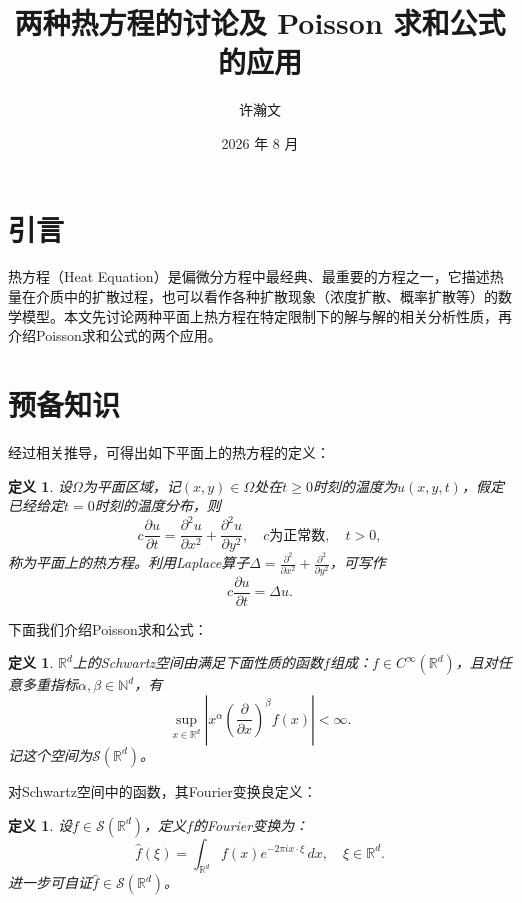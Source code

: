 \documentclass[UTF8,zihao=5,linespread=1.34]{ctexart}
\title{两种热方程的讨论及 Poisson 求和公式的应用}
\author{许瀚文}
\date{2026 年 8 月}
\theoremstyle{cnplain}
\newtheorem{definition}[theorem]{定义}
\theoremstyle{cnremark}
\begin{document}
\maketitle

\section*{引言}

热方程（Heat Equation）是偏微分方程中最经典、最重要的方程之一，它描述热量在介质中的扩散过程，也可以看作各种扩散现象（浓度扩散、概率扩散等）的数学模型。本文先讨论两种平面上热方程在特定限制下的解与解的相关分析性质，再介绍Poisson求和公式的两个应用。

\setcounter{section}{-1}
\section{预备知识}

经过相关推导，可得出如下平面上的热方程的定义：

\begin{definition}
设$\Omega$为平面区域，记$(x,y) \in \Omega$处在$t \geq 0$时刻的温度为$u(x,y,t)$，假定已经给定$t = 0$时刻的温度分布，则
\[
c\frac{\partial u}{\partial t} = \frac{\partial^{2}u}{\partial x^{2}} + \frac{\partial^{2}u}{\partial y^{2}},\quad c\text{为正常数},\quad t>0,
\]
称为平面上的热方程。利用Laplace算子$\Delta = \frac{\partial^{2}}{\partial x^{2}} + \frac{\partial^{2}}{\partial y^{2}}$，可写作
\[
c\frac{\partial u}{\partial t} = \Delta u.
\]
\end{definition}

下面我们介绍Poisson求和公式：

\begin{definition}\label{def:schwartz}
$\mathbb{R}^{d}$上的Schwartz空间由满足下面性质的函数$f$组成：$f \in C^{\infty}(\mathbb{R}^{d})$，且对任意多重指标$\alpha,\beta \in \mathbb{N}^{d}$，有
\[
\sup_{x \in \mathbb{R}^{d}} |x^{\alpha} ( \frac{\partial}{\partial x} )^{\beta} f(x)| < \infty.
\]
记这个空间为$\mathcal{S}(\mathbb{R}^{d})$。
\end{definition}

对Schwartz空间中的函数，其Fourier变换良定义：

\begin{definition}
设$f \in \mathcal{S}(\mathbb{R}^{d})$，定义$f$的Fourier变换为：
\[
\widehat{f}(\xi) = \int_{\mathbb{R}^{d}} f(x) e^{-2\pi i x \cdot \xi}\,dx,\quad \xi \in \mathbb{R}^{d}.
\]
进一步可自证$\widehat{f} \in \mathcal{S}(\mathbb{R}^{d})$。
\end{definition}
\end{document}
